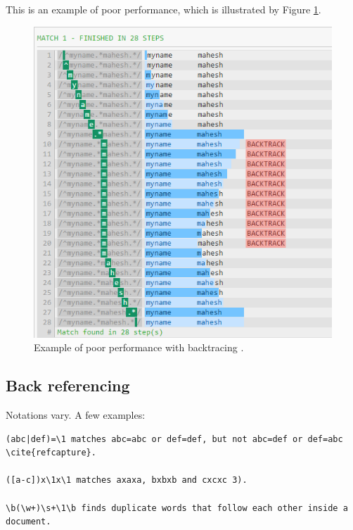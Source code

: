 \documentclass[11pt]{article}
\begin{document}
This is an example of poor performance, which is illustrated by Figure \ref{fig:poorperf}.

\begin{figure}[b]
  \centering
    \includegraphics[width=.8\linewidth]{poorperf}
    \caption{Example of poor performance with backtracing \cite{regx101}.}
    \label{fig:poorperf}
\end{figure}

\subsection{Back referencing}
Notations vary. A few examples:

\begin{verbatim}
(abc|def)=\1 matches abc=abc or def=def, but not abc=def or def=abc \cite{refcapture}.

([a-c])x\1x\1 matches axaxa, bxbxb and cxcxc 3).

\b(\w+)\s+\1\b finds duplicate words that follow each other inside a document.
\end{verbatim}

\newpage
\end{document}

